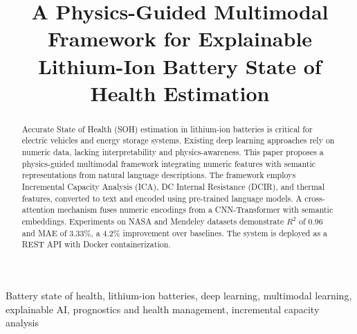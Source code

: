 \documentclass[conference]{IEEEtran}
\begin{document}
\title{A Physics-Guided Multimodal Framework for Explainable Lithium-Ion Battery State of Health Estimation}

\author{
\and
{}
\and
{}
\and
{}
}

\maketitle

\begin{abstract}
Accurate State of Health (SOH) estimation in lithium-ion batteries is critical for electric vehicles and energy storage systems. Existing deep learning approaches rely on numeric data, lacking interpretability and physics-awareness. This paper proposes a physics-guided multimodal framework integrating numeric features with semantic representations from natural language descriptions. The framework employs Incremental Capacity Analysis (ICA), DC Internal Resistance (DCIR), and thermal features, converted to text and encoded using pre-trained language models. A cross-attention mechanism fuses numeric encodings from a CNN-Transformer with semantic embeddings. Experiments on NASA and Mendeley datasets demonstrate $R^2$ of 0.96 and MAE of 3.33\%, a 4.2\% improvement over baselines. The system is deployed as a REST API with Docker containerization.
\end{abstract}

\begin{IEEEkeywords}
Battery state of health, lithium-ion batteries, deep learning, multimodal learning, explainable AI, prognostics and health management, incremental capacity analysis
\end{IEEEkeywords}
\end{document}
